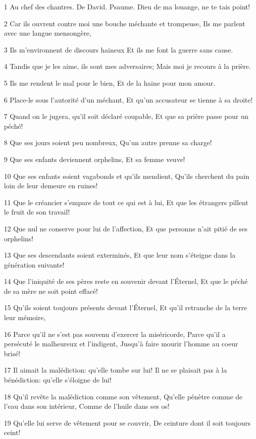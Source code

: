 \par 1 Au chef des chantres. De David. Psaume. Dieu de ma louange, ne te tais point!
\par 2 Car ils ouvrent contre moi une bouche méchante et trompeuse, Ils me parlent avec une langue mensongère,
\par 3 Ils m'environnent de discours haineux Et ils me font la guerre sans cause.
\par 4 Tandis que je les aime, ils sont mes adversaires; Mais moi je recours à la prière.
\par 5 Ils me rendent le mal pour le bien, Et de la haine pour mon amour.
\par 6 Place-le sous l'autorité d'un méchant, Et qu'un accusateur se tienne à sa droite!
\par 7 Quand on le jugera, qu'il soit déclaré coupable, Et que sa prière passe pour un péché!
\par 8 Que ses jours soient peu nombreux, Qu'un autre prenne sa charge!
\par 9 Que ses enfants deviennent orphelins, Et sa femme veuve!
\par 10 Que ses enfants soient vagabonds et qu'ils mendient, Qu'ils cherchent du pain loin de leur demeure en ruines!
\par 11 Que le créancier s'empare de tout ce qui est à lui, Et que les étrangers pillent le fruit de son travail!
\par 12 Que nul ne conserve pour lui de l'affection, Et que personne n'ait pitié de ses orphelins!
\par 13 Que ses descendants soient exterminés, Et que leur nom s'éteigne dans la génération suivante!
\par 14 Que l'iniquité de ses pères reste en souvenir devant l'Éternel, Et que le péché de sa mère ne soit point effacé!
\par 15 Qu'ils soient toujours présents devant l'Éternel, Et qu'il retranche de la terre leur mémoire,
\par 16 Parce qu'il ne s'est pas souvenu d'exercer la miséricorde, Parce qu'il a persécuté le malheureux et l'indigent, Jusqu'à faire mourir l'homme au coeur brisé!
\par 17 Il aimait la malédiction: qu'elle tombe sur lui! Il ne se plaisait pas à la bénédiction: qu'elle s'éloigne de lui!
\par 18 Qu'il revête la malédiction comme son vêtement, Qu'elle pénètre comme de l'eau dans son intérieur, Comme de l'huile dans ses os!
\par 19 Qu'elle lui serve de vêtement pour se couvrir, De ceinture dont il soit toujours ceint!
